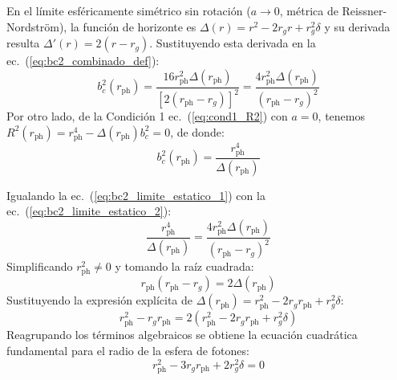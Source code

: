 En el límite esféricamente simétrico sin rotación ($a \to 0$, métrica de Reissner-Nordström), la función de horizonte es $\Delta(r) = r^2 - 2 r_g r + r_g^2 \delta$ y su derivada resulta $\Delta'(r) = 2(r - r_g)$. Sustituyendo esta derivada en la ec.~(\ref{eq:bc2_combinado_def}):
\begin{equation}
    b_c^2(r_{\mathrm{ph}}) = \frac{16 r_{\mathrm{ph}}^2 \Delta(r_{\mathrm{ph}})}{[2(r_{\mathrm{ph}} - r_g)]^2} = \frac{4 r_{\mathrm{ph}}^2 \Delta(r_{\mathrm{ph}})}{(r_{\mathrm{ph}} - r_g)^2}
    \label{eq:bc2_limite_estatico_1}
\end{equation}
Por otro lado, de la Condición 1 ec.~(\ref{eq:cond1_R2}) con $a=0$, tenemos $R^2(r_{\mathrm{ph}}) = r_{\mathrm{ph}}^4 - \Delta(r_{\mathrm{ph}}) b_c^2 = 0$, de donde:
\begin{equation}
    b_c^2(r_{\mathrm{ph}}) = \frac{r_{\mathrm{ph}}^4}{\Delta(r_{\mathrm{ph}})}
    \label{eq:bc2_limite_estatico_2}
\end{equation}

Igualando la ec.~(\ref{eq:bc2_limite_estatico_1}) con la ec.~(\ref{eq:bc2_limite_estatico_2}):
\begin{equation}
    \frac{r_{\mathrm{ph}}^4}{\Delta(r_{\mathrm{ph}})} = \frac{4 r_{\mathrm{ph}}^2 \Delta(r_{\mathrm{ph}})}{(r_{\mathrm{ph}} - r_g)^2}
    \label{eq:igualdad_bc2}
\end{equation}
Simplificando $r_{\mathrm{ph}}^2 \neq 0$ y tomando la raíz cuadrada:
\begin{equation}
    r_{\mathrm{ph}} (r_{\mathrm{ph}} - r_g) = 2 \Delta(r_{\mathrm{ph}})
    \label{eq:ec_rph_paso1}
\end{equation}
Sustituyendo la expresión explícita de $\Delta(r_{\mathrm{ph}}) = r_{\mathrm{ph}}^2 - 2 r_g r_{\text{ph}} + r_g^2 \delta$:
\begin{equation}
    r_{\mathrm{ph}}^2 - r_g r_{\mathrm{ph}} = 2 \left( r_{\mathrm{ph}}^2 - 2 r_g r_{\mathrm{ph}} + r_g^2 \delta \right)
    \label{eq:ec_rph_paso2}
\end{equation}
Reagrupando los términos algebraicos se obtiene la ecuación cuadrática fundamental para el radio de la esfera de fotones:
\begin{equation}
    r_{\mathrm{ph}}^2 - 3 r_g r_{\mathrm{ph}} + 2 r_g^2 \delta = 0
    \label{eq:cuadratica_rph}
\end{equation}

